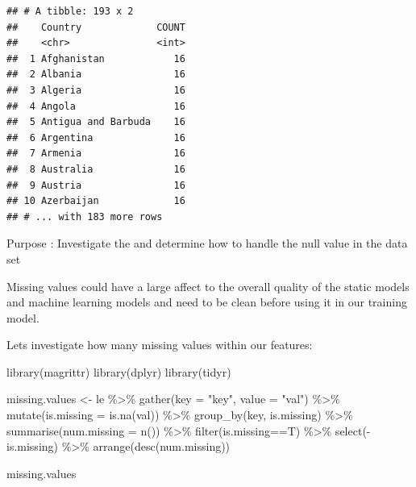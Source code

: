 \documentclass[
]{article}
\newenvironment{Shaded}{\begin{snugshade}}{\end{snugshade}}
\newcommand{\AttributeTok}[1]{\textcolor[rgb]{0.77,0.63,0.00}{#1}}
\newcommand{\FunctionTok}[1]{\textcolor[rgb]{0.00,0.00,0.00}{#1}}
\newcommand{\NormalTok}[1]{#1}
\newcommand{\OtherTok}[1]{\textcolor[rgb]{0.56,0.35,0.01}{#1}}
\newcommand{\SpecialCharTok}[1]{\textcolor[rgb]{0.00,0.00,0.00}{#1}}
\newcommand{\StringTok}[1]{\textcolor[rgb]{0.31,0.60,0.02}{#1}}
\begin{document}
\begin{verbatim}
## # A tibble: 193 x 2
##    Country             COUNT
##    <chr>               <int>
##  1 Afghanistan            16
##  2 Albania                16
##  3 Algeria                16
##  4 Angola                 16
##  5 Antigua and Barbuda    16
##  6 Argentina              16
##  7 Armenia                16
##  8 Australia              16
##  9 Austria                16
## 10 Azerbaijan             16
## # ... with 183 more rows
\end{verbatim}

Purpose : Investigate the and determine how to handle the null value in
the data set

Missing values could have a large affect to the overall quality of the
static models and machine learning models and need to be clean before
using it in our training model.

Lets investigate how many missing values within our features:

\begin{Shaded}
\begin{Highlighting}[]
\FunctionTok{library}\NormalTok{(magrittr) }
\FunctionTok{library}\NormalTok{(dplyr)  }
\FunctionTok{library}\NormalTok{(tidyr)}

\NormalTok{missing.values }\OtherTok{\textless{}{-}}\NormalTok{ le }\SpecialCharTok{\%\textgreater{}\%}
    \FunctionTok{gather}\NormalTok{(}\AttributeTok{key =} \StringTok{"key"}\NormalTok{, }\AttributeTok{value =} \StringTok{"val"}\NormalTok{) }\SpecialCharTok{\%\textgreater{}\%}
    \FunctionTok{mutate}\NormalTok{(}\AttributeTok{is.missing =} \FunctionTok{is.na}\NormalTok{(val)) }\SpecialCharTok{\%\textgreater{}\%}
    \FunctionTok{group\_by}\NormalTok{(key, is.missing) }\SpecialCharTok{\%\textgreater{}\%}
    \FunctionTok{summarise}\NormalTok{(}\AttributeTok{num.missing =} \FunctionTok{n}\NormalTok{()) }\SpecialCharTok{\%\textgreater{}\%}
    \FunctionTok{filter}\NormalTok{(is.missing}\SpecialCharTok{==}\NormalTok{T) }\SpecialCharTok{\%\textgreater{}\%}
    \FunctionTok{select}\NormalTok{(}\SpecialCharTok{{-}}\NormalTok{is.missing) }\SpecialCharTok{\%\textgreater{}\%}
    \FunctionTok{arrange}\NormalTok{(}\FunctionTok{desc}\NormalTok{(num.missing)) }

\NormalTok{missing.values}
\end{Highlighting}
\end{Shaded}
\end{document}
